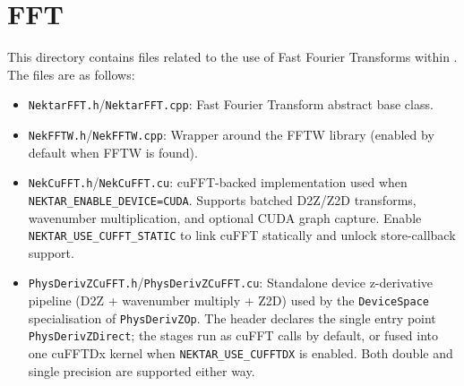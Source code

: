 %
\section{FFT}

This directory contains files related to the use of Fast Fourier Transforms within {\nek}.  The files are as follows:
\begin{itemize}
\item \texttt{NektarFFT.h}/\texttt{NektarFFT.cpp}: Fast Fourier Transform
  abstract base class.
%
\item \texttt{NekFFTW.h}/\texttt{NekFFTW.cpp}: Wrapper around the FFTW
  library (enabled by default when FFTW is found).
%
\item \texttt{NekCuFFT.h}/\texttt{NekCuFFT.cu}: cuFFT-backed implementation
  used when \texttt{NEKTAR\_ENABLE\_DEVICE=CUDA}. Supports batched D2Z/Z2D
  transforms, wavenumber multiplication, and optional CUDA graph capture.
  Enable \texttt{NEKTAR\_USE\_CUFFT\_STATIC} to link cuFFT statically and
  unlock store-callback support.
%
\item \texttt{PhysDerivZCuFFT.h}/\texttt{PhysDerivZCuFFT.cu}: Standalone
  device z-derivative pipeline (D2Z + wavenumber multiply + Z2D) used by the
  \texttt{DeviceSpace} specialisation of \texttt{PhysDerivZOp}. The header
  declares the single entry point \texttt{PhysDerivZDirect}; the stages run
  as cuFFT calls by default, or fused into one cuFFTDx kernel when
  \texttt{NEKTAR\_USE\_CUFFTDX} is enabled. Both double and single precision
  are supported either way.
\end{itemize}